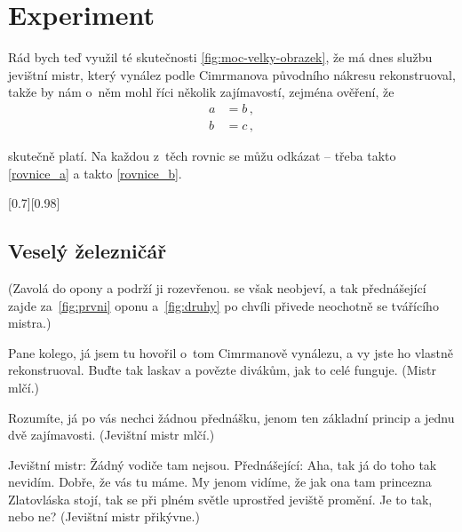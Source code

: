 \documentclass{cygclanek}
\begin{document}
\section{Experiment}
Rád bych teď využil té skutečnosti \ref{fig:moc-velky-obrazek}, že má dnes
službu jevištní mistr, který vynález podle Cimrmanova původního nákresu
rekonstruoval, takže by nám o~něm mohl říci několik zajímavostí, zejména
ověření, že 
\begin{align}
  a &= b \label{rovnice_a} \,,\\
  b &= c \label{rovnice_b} \,,
\end{align}

skutečně platí. Na každou z~těch rovnic se můžu odkázat -- třeba takto
\eqref{rovnice_a} a takto \eqref{rovnice_b}.



[0.7][0.98]



\subsection{Veselý železničář}
(Zavolá do opony a podrží ji rozevřenou.  se však neobjeví, a tak přednášející zajde za~\ref{fig:prvni} oponu a~\ref{fig:druhy} po chvíli přivede neochotně se tvářícího mistra.)


Pane kolego, já jsem tu hovořil o~tom Cimrmanově vynálezu, a vy jste ho vlastně rekonstruoval. Buďte tak laskav a povězte divákům, jak to celé funguje. (Mistr mlčí.)

Rozumíte, já po vás nechci žádnou přednášku, jenom ten základní princip a jednu dvě zajímavosti. (Jevištní mistr mlčí.)

Jevištní mistr: Žádný vodiče tam nejsou. Přednášející: Aha, tak já do toho tak nevidím. Dobře, že vás tu máme. My jenom vidíme, že jak ona tam princezna Zlatovláska stojí, tak se při plném světle uprostřed jeviště promění. Je to tak, nebo ne? (Jevištní mistr přikývne.)
\end{document}
